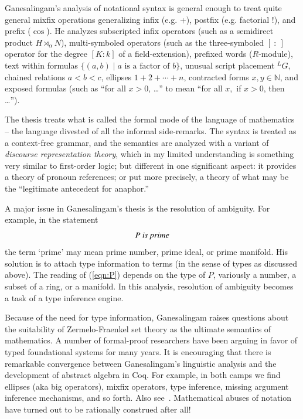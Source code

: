 \documentclass{llncs}
\newcommand{\ring}[1]{\mathbb{#1}}
\begin{document}
Ganesalingam's analysis of notational syntax is general enough to
treat quite general mixfix operations generalizing infix (e.g. +),
postfix (e.g. factorial !), and prefix ($\cos$).  He analyzes
subscripted infix operators (such as a semidirect product
$H\rtimes_\alpha N$), multi-symboled operators (such as the
three-symboled $[~:~]$ operator for the degree $[K:k]$ of a
field-extension), prefixed words ($R$-module), text within formulas
$\{(a,b) \mid a \text{~is a factor of~} b\}$, unusual script placement
${}^LG$, chained relations $a<b<c$, ellipses $1+2+\cdots+n$,
contracted forms $x,y\in\ring{N}$, and exposed formulas (such as ``for
all $x>0$, \dots'' to mean ``for all $x$,~if $x>0$, then \dots'').

The thesis treats what is called the formal mode of the language of
mathematics -- the language divested of all the informal side-remarks.
The syntax is treated as a context-free grammar, and the semantics are
analyzed with a variant of {\it discourse representation theory},
which in my limited understanding is something very similar to
first-order logic; but different in one significant aspect: it
provides a theory of pronoun references; or put more precisely, a
theory of what may be the ``legitimate antecedent for anaphor.''

A major issue in Ganesalingam's thesis is the resolution of ambiguity.
For example, in the statement
\begin{equation}\label{eqn:P}
P \text{\it ~is prime}
\end{equation}
the term `prime' may mean prime number, prime ideal, or prime
manifold.  His solution is to attach type information to terms (in the
sense of types as discussed above).  The reading of (\ref{eqn:P})
depends on the type of $P$, variously a number, a subset of a ring, or
a manifold.  In this analysis, resolution of ambiguity becomes a task
of a type inference engine.

Because of the need for type information, Ganesalingam raises
questions about the suitability of Zermelo-Fraenkel set theory as the
ultimate semantics of mathematics.  A number of formal-proof
researchers have been arguing in favor of typed foundational systems
for many years.  It is encouraging that there is remarkable
convergence between Ganesalingam's linguistic analysis and the
development of abstract algebra in Coq. For example, in both camps we
find ellipses (aka big operators), mixfix operators, type inference,
missing argument inference mechanisms, and so forth.  Also
see~\cite{Hoe11}.  Mathematical abuses of notation have turned out to
be rationally construed after all! 
\end{document}

